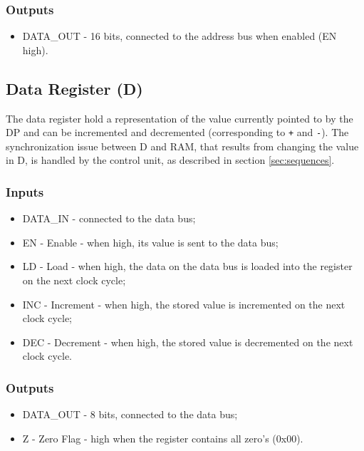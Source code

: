 \subsubsection*{Outputs}
\begin{itemize}
\item DATA\_OUT - 16 bits, connected to the address bus when enabled (EN high).
\end{itemize}

\subsection{Data Register (D)} \label{sec:architecture:d}
The data register hold a representation of the value currently pointed to by the DP and can be incremented and decremented (corresponding to \texttt{+} and \texttt{-}). The synchronization issue between D and RAM, that results from changing the value in D, is handled by the control unit, as described in section \ref{sec:sequences}.

\subsubsection*{Inputs}
\begin{itemize}
\item DATA\_IN - connected to the data bus;
\item EN - Enable - when high, its value is sent to the data bus;
\item LD - Load - when high, the data on the data bus is loaded into the register on the next clock cycle;
\item INC - Increment - when high, the stored value is incremented on the next clock cycle;
\item DEC - Decrement - when high, the stored value is decremented on the next clock cycle.
\end{itemize}

\subsubsection*{Outputs}
\begin{itemize}
\item DATA\_OUT - 8 bits, connected to the data bus;
\item Z - Zero Flag - high when the register contains all zero's (0x00).
\end{itemize}


